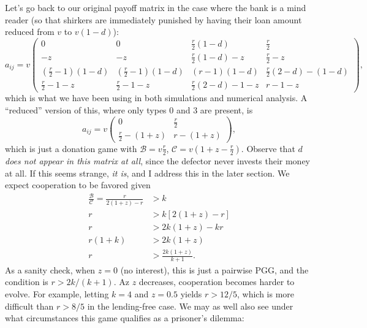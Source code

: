\documentclass[13pt]{amsart}
\newcommand{\B}{\mathcal{B}}
\newcommand{\C}{\mathcal{C}}
\begin{document}
Let's go back to our original payoff matrix in the case where the bank is a mind reader (so that shirkers are immediately punished by having their loan amount reduced from $v$ to $v(1-d)$):
\begin{equation}
    a_{ij} = v
    \begin{pmatrix}
        0 & 0 & \frac{r}{2}(1-d) & \frac{r}{2} \\
        -z & -z & \frac{r}{2}(1-d) -z & \frac{r}{2} -z \\
        (\frac{r}{2} - 1)(1-d) & (\frac{r}{2} - 1)(1-d) & (r-1)(1-d)& \frac{r}{2}(2 - d) - (1-d)\\
        \frac{r}{2} - 1 - z & \frac{r}{2} - 1 -z & \frac{r}{2}(2 - d) - 1 - z & r - 1 -z
    \end{pmatrix},
\end{equation}
which is what we have been using in both simulations and numerical analysis.
A ``reduced'' version of this, where only types $0$ and $3$ are present, is
\begin{equation}
    a_{ij} = v
    \begin{pmatrix}
        0 & \frac{r}{2} \\
        \frac{r}{2} - (1+z) & r - (1+z)
    \end{pmatrix},
\end{equation}
which is just a donation game with $\B = v\frac{r}{2}$, $\C = v(1 + z - \frac{r}{2})$.
Observe that $d$ \emph{does not appear in this matrix at all}, since the defector never invests their money at all.
If this seems strange, \emph{it is}, and I address this in the later section.
We expect cooperation to be favored given
\begin{equation}
	\begin{split}
        \frac{\B}{\C} = \frac{r}{2(1+z) - r} & > k
        \\
        r & > k[2(1+z)-r]
        \\
        r & > 2k(1+z) - kr
        \\
        r(1+k) & > 2k(1+z)
        \\
        r & > \frac{2k(1+z)}{k+1}.
    \end{split}
\end{equation}
As a sanity check, when $z = 0$ (no interest), this is just a pairwise PGG, and the condition is $r > 2k/(k+1)$.
Az $z$ decreases, cooperation becomes harder to evolve.
For example, letting $k = 4$ and $z = 0.5$ yields $r > 12/5$, which is more difficult than $r > 8/5$ in the lending-free case.
We may as well also see under what circumstances this game qualifies as a prisoner's dilemma:
\end{document}
